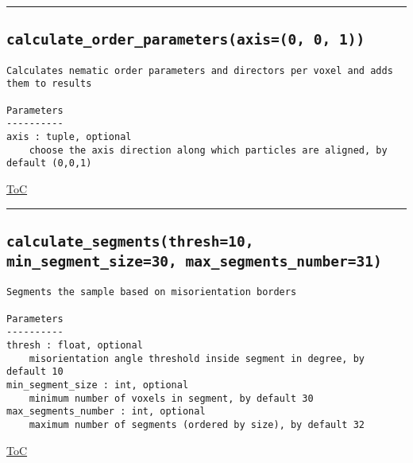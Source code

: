 \documentclass{article}
\begin{document}


\vspace{5mm}

\hrule

\subsection*{\texttt{calculate\_order\_parameters(axis=(0, 0, 1))}}
\label{fun:calculateorderparameters}

\begin{lstlisting}[language=docstring]
Calculates nematic order parameters and directors per voxel and adds them to results

Parameters
----------
axis : tuple, optional
    choose the axis direction along which particles are aligned, by default (0,0,1)
\end{lstlisting}

\begin{flushright}

\hyperref[toc]{ToC}

\end{flushright}



\vspace{5mm}

\hrule

\subsection*{\texttt{calculate\_segments(thresh=10, min\_segment\_size=30, max\_segments\_number=31)}}
\label{fun:calculatesegments}

\begin{lstlisting}[language=docstring]
Segments the sample based on misorientation borders

Parameters
----------
thresh : float, optional
    misorientation angle threshold inside segment in degree, by default 10
min_segment_size : int, optional
    minimum number of voxels in segment, by default 30
max_segments_number : int, optional
    maximum number of segments (ordered by size), by default 32
\end{lstlisting}

\begin{flushright}

\hyperref[toc]{ToC}

\end{flushright}
\end{document}
